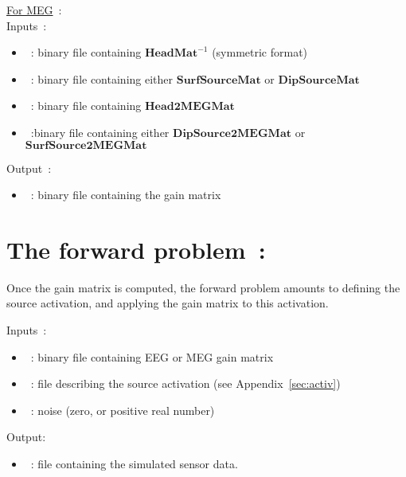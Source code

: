 \bigskip

\checkItem\underline{For MEG}~:\\
Inputs~:
\begin{itemize}
    \item {}~: binary file containing $\mathbf{HeadMat}^{-1}$ (symmetric format)
    \item {}~: binary file containing either  $\mathbf{SurfSourceMat}$ or  $\mathbf{DipSourceMat}$
    \item {}~: binary file containing $\mathbf{Head2MEGMat}$
    \item {}~:binary file containing either  $\mathbf{DipSource2MEGMat}$ or $\mathbf{SurfSource2MEGMat}$
\end{itemize}
Output~:
\begin{itemize}
    \item {}~: binary file containing the gain matrix
\end{itemize}

\medskip

\noindent
{}


\section{The forward problem~:}
\label{sect: command direct}

Once the gain matrix is computed, the forward problem amounts to defining the source activation, and applying the gain matrix to this activation.

Inputs~: 
\begin{itemize}
    \item {}~: binary file containing EEG or MEG gain matrix
    \item {}~: file describing the source activation (see Appendix~\ref{sec:activ})
    \item {}~: noise (zero, or positive real number)
\end{itemize}
Output:
\begin{itemize}
    \item {}~: file containing the simulated sensor data.
\end{itemize}

\medskip

\noindent
{}
